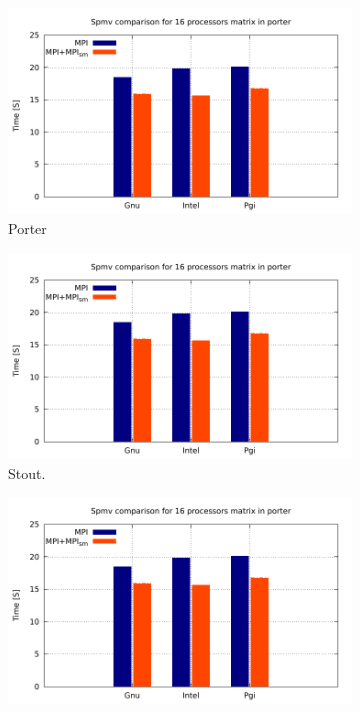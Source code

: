 \begin{figure} [h!]
    \centering
    \captionsetup{justification=centering, singlelinecheck=false}
    \begin{subfigure}{.6\textwidth}
      \centering
      \hspace*{-1.5cm} 
      \includegraphics[page=1, width=0.95\linewidth]{Plots/HybridProgramming/spmvIndividual.pdf}
      \caption[]{Porter}
      \label{fig:HybridPorter}
    \end{subfigure}%
    \begin{subfigure}{.6\textwidth}
      \centering
      \hspace*{-1.5cm} 
      \includegraphics[page=2, width=0.95\linewidth]{Plots/HybridProgramming/spmvIndividual.pdf}
      \caption{Stout.}
      \label{fig:HybridStout}
    \end{subfigure}
    \begin{subfigure}{.6\textwidth}
      \centering
      \hspace*{-1.5cm} 
      \includegraphics[page=3, width=0.95\linewidth]{Plots/HybridProgramming/spmvIndividual.pdf}

\end{subfigure}
\end{figure}
